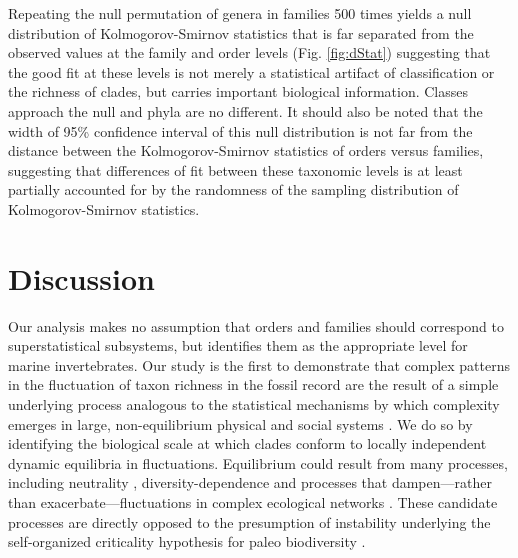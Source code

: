 \documentclass[12pt]{article}
\let\citep=\cite
\begin{document}
Repeating the null permutation of genera in families 500 times yields
a null distribution of Kolmogorov-Smirnov statistics that is far
separated from the observed values at the family and order levels
(Fig. \ref{fig:dStat}) suggesting that the good fit at these levels is
not merely a statistical artifact of classification or the richness of
clades, but carries important biological information. Classes approach
the null and phyla are no different. It should also be noted that the
width of 95\% confidence interval of this null distribution is not far
from the distance between the Kolmogorov-Smirnov statistics of orders
versus families, suggesting that differences of fit between these
taxonomic levels is at least partially accounted for by the randomness
of the sampling distribution of Kolmogorov-Smirnov statistics.

\section{Discussion}

Our analysis makes no assumption that orders and families should
correspond to superstatistical subsystems, but identifies them as the
appropriate level for marine invertebrates. Our study is the first to
demonstrate that complex patterns in the fluctuation of taxon richness
in the fossil record are the result of a simple underlying process
analogous to the statistical mechanisms by which complexity emerges in
large, non-equilibrium physical \citep{beck2004} and social systems
\citep{fuentes2009}.  We do so by identifying the biological scale at
which clades conform to locally independent dynamic equilibria in
fluctuations.  Equilibrium could result from many processes, including
neutrality \citep{macWilson, hubbell2001, olszewski2004},
diversity-dependence \citep{rabosky2009ecolLett, moen2014, foote2018}
and processes that dampen---rather than exacerbate---fluctuations in
complex ecological networks \citep{berlow2009}. These candidate
processes are directly opposed to the presumption of instability
underlying the self-organized criticality hypothesis for paleo
biodiversity \citep{bak1993, sole1997}.
\end{document}
